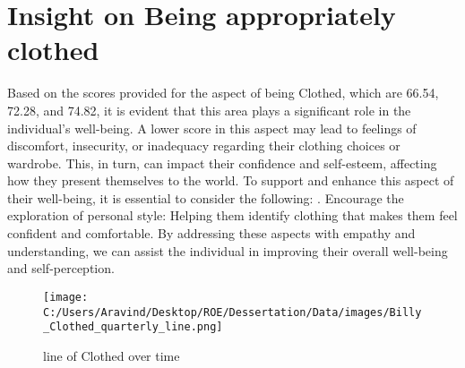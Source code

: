 \documentclass[10pt, a4paper]{article}%
\begin{document}
%
\section{Insight on Being appropriately clothed}%
\label{sec:InsightonBeingappropriatelyclothed}%
Based on the scores provided for the aspect of being Clothed, which are 66.54, 72.28, and 74.82, it is evident that this area plays a significant role in the individual's well{-}being. A lower score in this aspect may lead to feelings of discomfort, insecurity, or inadequacy regarding their clothing choices or wardrobe. This, in turn, can impact their confidence and self{-}esteem, affecting how they present themselves to the world.\newline%
\newline%
To support and enhance this aspect of their well{-}being, it is essential to consider the following:\newline%
. Encourage the exploration of personal style: Helping them identify clothing that makes them feel confident and comfortable.\newline%
\newline%
By addressing these aspects with empathy and understanding, we can assist the individual in improving their overall well{-}being and self{-}perception.%
\begin{figure}[H]%
\centering%
\texttt{[image: C:/Users/Aravind/Desktop/ROE/Dessertation/Data/images/Billy\_Clothed\_quarterly\_line.png]}%
\caption{line of Clothed over time}%
\end{figure}

%
\end{document}

